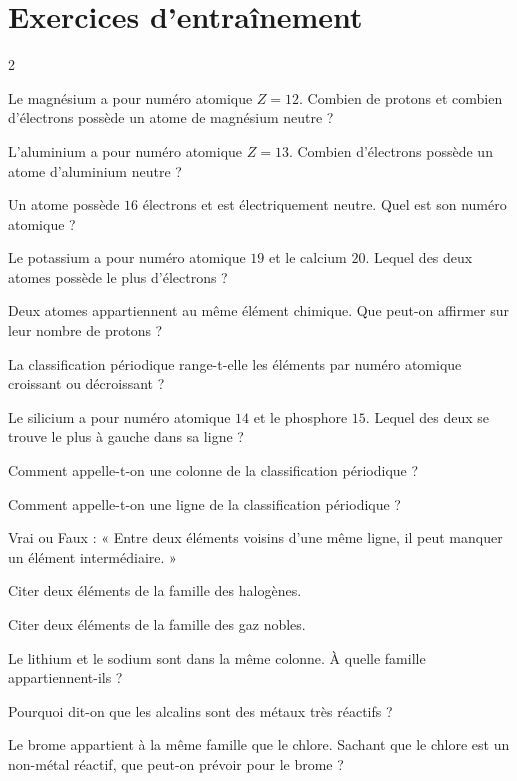 \section{Exercices d'entraînement}
\begin{multicols}{2}

\exo{} Le magnésium a pour numéro atomique $Z=12$. Combien de protons et
combien d'électrons possède un atome de magnésium neutre ?

\exo{} L'aluminium a pour numéro atomique $Z=13$. Combien d'électrons possède un
atome d'aluminium neutre ?

\exo{} Un atome possède $16$ électrons et est électriquement neutre. Quel est son
numéro atomique ?

\exo{} Le potassium a pour numéro atomique $19$ et le calcium $20$. Lequel des
deux atomes possède le plus d'électrons ?

\exo{} Deux atomes appartiennent au même élément chimique. Que peut-on affirmer
sur leur nombre de protons ?

\exo{} La classification périodique range-t-elle les éléments par numéro
atomique croissant ou décroissant ?

\exo{} Le silicium a pour numéro atomique $14$ et le phosphore $15$. Lequel des
deux se trouve le plus à gauche dans sa ligne ?

\exo{} Comment appelle-t-on une colonne de la classification périodique ?

\exo{} Comment appelle-t-on une ligne de la classification périodique ?

\exo{} Vrai ou Faux : « Entre deux éléments voisins d'une même ligne, il peut
manquer un élément intermédiaire. »

\exo{} Citer deux éléments de la famille des halogènes.

\exo{} Citer deux éléments de la famille des gaz nobles.

\exo{} Le lithium et le sodium sont dans la même colonne. À quelle famille
appartiennent-ils ?

\exo{} Pourquoi dit-on que les alcalins sont des métaux très réactifs ?

\exo{} Le brome appartient à la même famille que le chlore. Sachant que le chlore
est un non-métal réactif, que peut-on prévoir pour le brome ?


\end{multicols}
